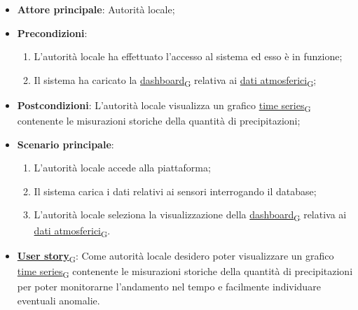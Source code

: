 \begin{itemize}
	\item \textbf{Attore principale}: Autorità locale;
	\item \textbf{Precondizioni}:
	      \begin{enumerate}
		      \item L'autorità locale ha effettuato l'accesso al sistema ed esso è in funzione;
		      \item Il sistema ha caricato la \href{https://7last.github.io/docs/rtb/documentazione-interna/glossario\#dashboard}{dashboard\textsubscript{G}} relativa ai \href{https://7last.github.io/docs/rtb/documentazione-interna/glossario\#dati-atmosferici}{dati atmosferici\textsubscript{G}};
	      \end{enumerate}

	\item \textbf{Postcondizioni}: L'autorità locale visualizza un grafico \href{https://7last.github.io/docs/rtb/documentazione-interna/glossario\#time-series}{time series\textsubscript{G}} contenente le misurazioni storiche
	      della quantità di precipitazioni;

	\item \textbf{Scenario principale}:
	      \begin{enumerate}
		      \item L'autorità locale accede alla piattaforma;
		      \item Il sistema carica i dati relativi ai sensori interrogando il database;
		      \item L'autorità locale seleziona la visualizzazione della \href{https://7last.github.io/docs/rtb/documentazione-interna/glossario\#dashboard}{dashboard\textsubscript{G}} relativa ai \href{https://7last.github.io/docs/rtb/documentazione-interna/glossario\#dati-atmosferici}{dati atmosferici\textsubscript{G}}.
	      \end{enumerate}
	\item \href{https://7last.github.io/docs/rtb/documentazione-interna/glossario\#user-story}{\textbf{User story}\textsubscript{G}}: Come autorità locale desidero poter visualizzare un grafico \href{https://7last.github.io/docs/rtb/documentazione-interna/glossario\#time-series}{time series\textsubscript{G}} contenente le misurazioni storiche della quantità di precipitazioni
	      per poter monitorarne l'andamento nel tempo e facilmente individuare eventuali anomalie.

\end{itemize}


